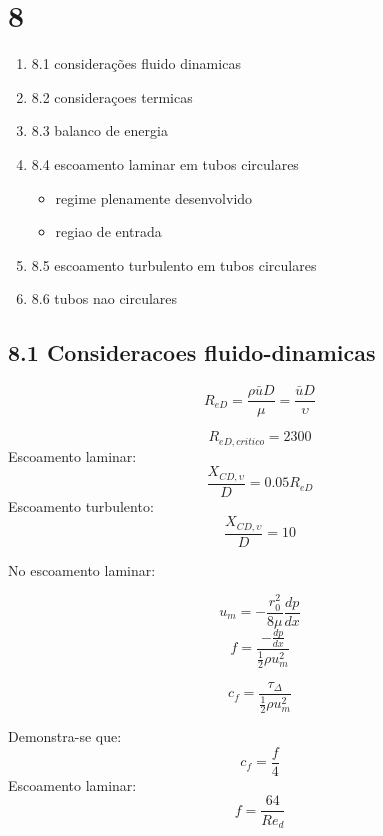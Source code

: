 \section*{8}

\begin{enumerate}
\item 8.1 considerações fluido dinamicas
\item 8.2 consideraçoes termicas
\item 8.3 balanco de energia
\item 8.4 escoamento laminar em tubos circulares
\begin{itemize}
\item regime plenamente desenvolvido
\item regiao de entrada
\end{itemize}
\item 8.5 escoamento turbulento em tubos circulares
\item 8.6 tubos nao circulares
\end{enumerate}

\subsection*{8.1 Consideracoes fluido-dinamicas}



\[R_{eD}= \frac{\rho \bar{u} D }{\mu } = \frac{\bar{u} D}{\upsilon}\]

\[R_{eD,critico}=2300\]
Escoamento laminar:
\[\frac{X_{CD,\upsilon}}{D} = 0.05R_{eD}\] 
Escoamento turbulento:
\[\frac{X_{CD,\upsilon}}{D} = 10\] 

No escoamento laminar:

\[u_{m}= - \frac{r_{0}^{2}}{8\mu} \frac{dp}{dx}\]
\[f = \frac{-\frac{dp}{dx}}{\frac{1}{2}\rho u_{m}^{2}}\]

\[c_{f}=\frac{\tau_{\Delta}}{\frac{1}{2}\rho u_{m}^{2}}\]

Demonstra-se que: 
\[c_{f} = \frac{f}{4}\]
Escoamento laminar: 
\[f= \frac{64}{Re_{d}}\]

